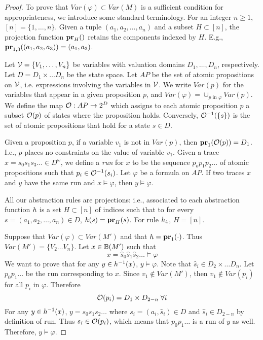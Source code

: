 \begin{proof}
	\newcommand{\hs}{\hat{s}}
	To prove that $Var(\varphi) \subset Var(M)$ is a sufficient condition for appropriateness, we introduce some standard terminology.
	For an integer $n \geq 1$, $[n] = \{1,\ldots,n\}$.
	Given a tuple $(a_1,a_2,\ldots,a_n)$ and a subset $H \subset [n]$, the projection function $\proj{}{H}$ retains the components indexed by $H$. E.g., $\proj{(a_1,a_2,a_3)}{1,3} = (a_1,a_3)$.
	
	Let $\Vc = \{V_1,\ldots, V_n\}$ be variables with valuation domains $D_1,\ldots,D_n$, respectively. 
	Let $D = D_1 \times \ldots D_n$ be the state space.
	Let $AP$ be the set of atomic propositions on $\Vc$, i.e. expressions involving the variables in $\Vc$.
	We write $Var(p)$ for the variables that appear in a given proposition $p$, and $Var(\varphi) = \cup_{p \textrm{ in } \varphi} Var(p)$.
	We define the map $\Oc: AP \rightarrow 2^D$ which assigns to each atomic proposition $p$ a subset $\Oc(p)$ of states where the proposition holds.
	Conversely, $\Oc^{-1}(\{s\})$ is the set of atomic propositions that hold for a state $s \in D$.

	Given a proposition $p$, if a variable $v_1$ is not in $Var(p)$, then $\proj{\Oc(p)}{1} = D_1$.
	I.e., $p$ places no constraints on the value of variable $v_1$.
	Given a trace $x = s_0 s_1 s_3 \ldots \in D^\omega$, we define a \emph{run} for $x$ to be the sequence $p_o p_1 p_2 \ldots$ of atomic propositions such that $p_i \in \Oc^{-1}(s_i)$.
	Let $\varphi$ be a formula on $AP$.
	If two traces $x$ and $y$ have the same run and $x \models \varphi$, then $y \models \varphi$.
	
	All our abstraction rules are projections: i.e., associated to each abstraction function $\absfun$ is a set $H \subset [n]$ of indices such that to for every $s = (a_1,a_2,\ldots,a_n) \in D$, $h(s) = \proj{s}{H}$.
	For rule $\absfun_4$, $H = [n]$.
	
	Suppose that $Var(\varphi) \subset Var(M')$ and that $\absfun = \proj{\cdot}{1}$.
	Thus $Var(M') = \{V_2 \ldots V_n\}$.
	Let $x \in \beh(M')$ such that
	\[x = \hs_0 \hs_1 \hs_2 \ldots \models \varphi\] 
	We want to prove that for any $y \in \absfun^{-1}(x)$, $y \models \varphi$.
	Note that $\hs_i \in D_2 \times \ldots D_n$.
	Let $p_0 p_1 \ldots$ be the run corresponding to $x$.
	Since $v_1 \notin Var(M')$, then $v_1 \notin Var(p_i)$ for all $p_i$ in $\varphi$.
	Therefore 
	\[\Oc(p_i) = D_1 \times D_{2-n}\; \forall i\]
	For any $y \in \absfun^{-1}(x)$, $y = s_0 s_1 s_2 \ldots$ where $s_i = (a_i, \hs_i) \in D$
	and $\hs_i \in D_{2-n}$ by definition of run.
	Thus $s_i \in \Oc(p_i)$, which means that $p_0 p_1 \ldots$ is a run of $y$ as well.
	Therefore, $y \models \varphi$.
	
	
	
	
	\end{proof}
	